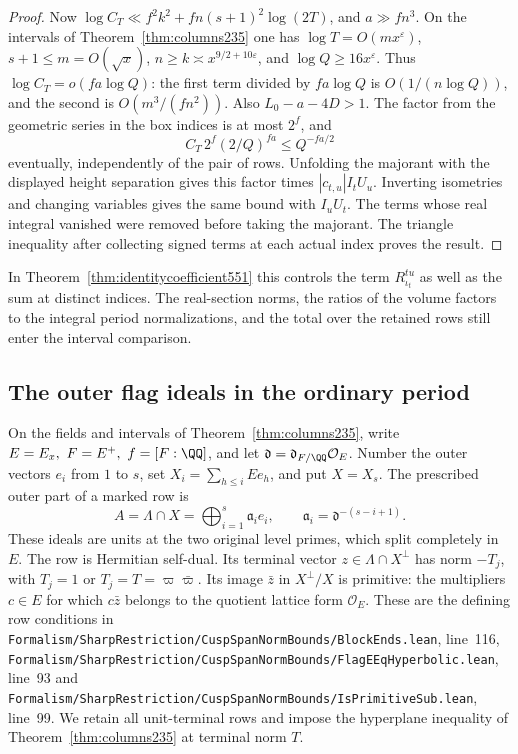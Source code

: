 \documentclass[a4paper,11pt]{article}
\theoremstyle{definition}
\theoremstyle{remark}
\newcommand{\srcloc}[2]{{\small\nolinkurl{#1.lean}}, line~#2}
\numberwithin{equation}{section}
\begin{document}
\begin{proof}
Now \(\log C_T\ll f^2 k^2+fn(s+1)^2\log(2T)\), and \(a\gg fn^3\).
On the intervals of Theorem~\ref{thm:columns235} one has
\(\log T=O(m x^\varepsilon)\), \(s+1\le m=O(\sqrt x)\),
\(n\ge k\asymp x^{9/2+10\varepsilon}\), and
\(\log Q\ge16x^\varepsilon\). Thus \(\log C_T=o(fa\log Q)\):
the first term divided by \(fa\log Q\) is
\(O(1/(n\log Q))\), and the second is \(O(m^3/(f n^2))\).
Also \(L_0-a-4D>1\). The factor from the geometric series in
the box indices is at most \(2^f\), and
\[
              C_T\,2^f(2/Q)^{fa}\le Q^{-fa/2}
\]
eventually, independently of the pair of rows. Unfolding the
majorant with the displayed height separation gives this factor
times \(|c_{t,u}|I_tU_u\). Inverting isometries and changing
variables gives the same bound with \(I_uU_t\). The terms
whose real integral vanished were removed before taking the
majorant. The triangle inequality after collecting signed
terms at each actual index proves the result.
\end{proof}

In Theorem~\ref{thm:identitycoefficient551} this controls the
term \(R_{\iota_t}^{tu}\) as well as the sum at distinct
indices. The real-section norms, the ratios of the volume
factors to the integral period normalizations, and the total
over the retained rows still enter the interval comparison.


\subsection{The outer flag ideals in the ordinary period}
\label{sec:flagideals554}

On the fields and intervals of Theorem~\ref{thm:columns235},
write \(E=E_x,\ F=E^+,\ f=[F:\QQ]\), and let
\(\mathfrak d=\mathfrak d_{F/\QQ}\mathcal O_E\).
Number the outer vectors \(e_i\) from \(1\) to \(s\), set
\(X_i=\sum_{h\le i}Ee_h\), and put \(X=X_s\). The prescribed
outer part of a marked row is
\[
 A=\Lambda\cap X=\bigoplus_{i=1}^{s}\mathfrak a_i e_i,
 \qquad \mathfrak a_i=\mathfrak d^{-(s-i+1)}.
\]
These ideals are units at the two original level primes, which
split completely in \(E\). The row is Hermitian self-dual.
Its terminal vector \(z\in\Lambda\cap X^\perp\) has norm
\(-T_j\), with \(T_j=1\) or \(T_j=T=\varpi\bar\varpi\).
Its image \(\bar z\) in \(X^\perp/X\) is primitive: the
multipliers \(c\in E\) for which \(c\bar z\) belongs to the
quotient lattice form \(\mathcal O_E\). These are the defining
row conditions in
\srcloc{Formalism/SharpRestriction/CuspSpanNormBounds/BlockEnds}{116},
\srcloc{Formalism/SharpRestriction/CuspSpanNormBounds/FlagEEqHyperbolic}{93}
and
\srcloc{Formalism/SharpRestriction/CuspSpanNormBounds/IsPrimitiveSub}{99}.
We retain all unit-terminal rows and impose the hyperplane
inequality of Theorem~\ref{thm:columns235} at terminal norm \(T\).
\end{document}
